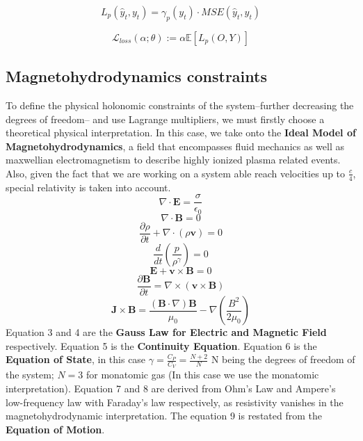 \documentclass{article}
\begin{document}
\begin{equation}
L_{p}(\hat{y}_t, y_t) = \gamma_{p}(y_t) \cdot MSE(\hat{y}_t, y_t)
    \end{equation}

\begin{equation}
\mathcal{L}_{loss}(\alpha;\theta):=\alpha\mathbb{E}[{L_{p}(O, Y)}]
\end{equation}

\subsection{Magnetohydrodynamics constraints}
To define the physical holonomic constraints of the system--further decreasing the degrees of freedom-- and use Lagrange multipliers, we must firstly choose a theoretical physical interpretation. In this case, we take onto the \textbf{Ideal Model of Magnetohydrodynamics}, a field that encompasses fluid mechanics as well as maxwellian electromagnetism to describe highly ionized plasma related events.  Also, given the fact that we are working on a system able reach velocities up to $\frac{c}{4}$, special relativity is taken into account.
\begin{equation}
    \nabla \cdot \textbf{E} = \frac{\sigma}{\epsilon_0}
\end{equation}
\begin{equation}
    \nabla \cdot \textbf{B} = 0
\end{equation}
\begin{equation}
    \frac{\partial \rho}{\partial t} + \nabla \cdot (\rho \textbf{v}) = 0
\end{equation}
\begin{equation}
    \frac{d}{dt} \left( \frac{p}{\rho^\gamma} \right)= 0
\end{equation}
\begin{equation}
    \textbf{E} + \textbf{v} \times \textbf{B} = 0
\end{equation}
\begin{equation}
    \frac{\partial \textbf{B}}{\partial t} = \nabla \times (\textbf{v} \times \textbf{B})
\end{equation}
\begin{equation}
    \textbf{J} \times \textbf{B} = \frac{(\textbf{B}\cdot \nabla) \textbf{B}}{\mu_0} - \nabla \left(\frac{B^2}{2\mu_0}\right)
\end{equation}
Equation 3 and 4 are the \textbf{Gauss Law for Electric and Magnetic Field} respectively. Equation 5 is the \textbf{Continuity Equation}. Equation 6 is the \textbf{Equation of State}, in this case $\gamma = \frac{C_P}{C_V} = \frac{N + 2}{N}$ N being the degrees of freedom of the system; $N = 3$ for monatomic gas (In this case we use the monatomic interpretation). Equation 7 and 8 are derived from Ohm's Law and Ampere's low-frequency law with Faraday's law respectively, as resistivity vanishes in the magnetohydrodynamic interpretation. The equation 9 is restated from the \textbf{Equation of Motion}.
\end{document}
